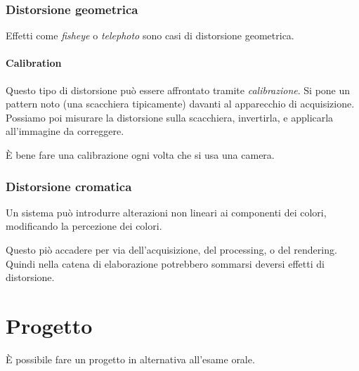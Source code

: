 \documentclass{article}
\begin{document}
\subsubsection{Distorsione geometrica}
Effetti come \textit{fisheye} o \textit{telephoto} sono casi di distorsione geometrica. 

\paragraph{Calibration}
Questo tipo di distorsione può essere affrontato tramite \textit{calibrazione}.
Si pone un pattern noto (una scacchiera tipicamente) davanti al apparecchio di acquisizione. Possiamo poi misurare la distorsione sulla scacchiera, invertirla, e applicarla all'immagine da correggere.

È bene fare una calibrazione ogni volta che si usa una camera.

\subsubsection{Distorsione cromatica}
Un sistema può introdurre alterazioni non lineari ai componenti dei colori, modificando la percezione dei colori.

Questo piò accadere per via dell'acquisizione, del processing, o del rendering. Quindi nella catena di elaborazione potrebbero sommarsi deversi effetti di distorsione.

\section{Progetto}
È possibile fare un progetto in alternativa all'esame orale.
\end{document}
